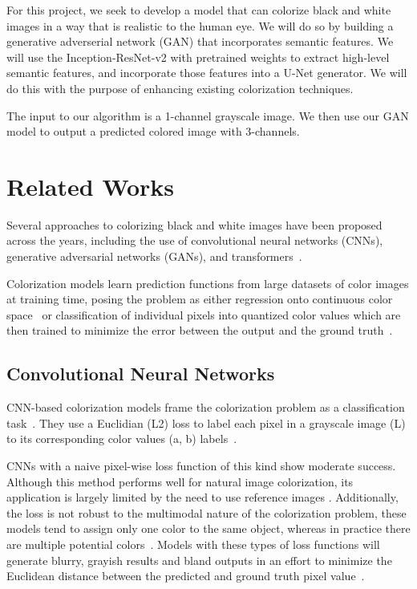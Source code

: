 \documentclass[10pt,twocolumn,letterpaper]{article}
\begin{document}
For this project, we seek to develop a model that can colorize black and white images in a way that is realistic to the human eye. We will do so by building a generative adverserial network (GAN) that incorporates semantic features. We will use the Inception-ResNet-v2 with pretrained weights to extract high-level semantic features, and incorporate those features into a U-Net generator. We will do this with the purpose of enhancing existing colorization techniques.

The input to our algorithm is a 1-channel grayscale image. We then use our GAN model to output a predicted colored image with 3-channels. 

\section{Related Works}
Several approaches to colorizing black and white images have been proposed across the years, including the use of convolutional neural networks (CNNs), generative adversarial networks (GANs), and transformers~\cite{Huang}.

Colorization models learn prediction functions from large datasets of color images at training time, posing the problem as either regression onto continuous color space~\cite{Zhang} or classification of individual pixels into quantized color values  which are then trained to minimize the error between the output and the ground truth~\cite{Koalarization}.

\subsection{Convolutional Neural Networks}
CNN-based colorization models frame the colorization problem as a classification task~\cite{Zhang}. They use a Euclidian (L2) loss to label each pixel in a grayscale image (L) to its corresponding color values (a, b) labels~\cite{Cheng, Zhang}.

CNNs with a naive pixel-wise loss function of this kind show moderate success. Although this method performs well for natural image colorization, its application is largely limited by the need to use reference images \cite{Huang}. Additionally, the loss is not robust to the multimodal nature of the colorization problem, these models tend to assign only one color to the same object, whereas in practice there are multiple potential colors~\cite{Zhang}. Models with these types of loss functions will generate blurry, grayish results and bland outputs in an effort to minimize the Euclidean distance between the predicted and ground truth pixel value~\cite{Pix2Pix}.
\end{document}
